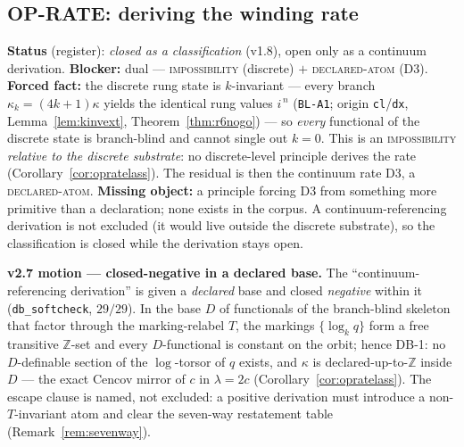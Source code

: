 \documentclass[11pt]{article}
\newcommand{\hx}[1]{\textcolor{cC}{\footnotesize\texttt{#1}}}
\newcommand{\Z}{\mathbb{Z}}
\theoremstyle{plain}
\theoremstyle{definition}
\theoremstyle{remark}
\begin{document}
\subsection{OP-RATE: deriving the winding rate}\label{blk:rate}
\textbf{Status} (register): \emph{closed as a classification} (v1.8), open only as a
continuum derivation. \textbf{Blocker:} dual --- \textsc{impossibility}
(discrete) $+$ \textsc{declared-atom} (D3). \textbf{Forced fact:} the discrete
rung state is $k$-invariant --- every branch $\kappa_k=(4k+1)\kappa$ yields the
identical rung values $i^{\,n}$ (\hx{BL-A1}; origin \texttt{cl}/\texttt{dx},
Lemma~\ref{lem:kinvext}, Theorem~\ref{thm:r6nogo}) --- so \emph{every} functional
of the discrete state is branch-blind and cannot single out $k=0$. This is an
\textsc{impossibility} \emph{relative to the discrete substrate}: no
discrete-level principle derives the rate (Corollary~\ref{cor:opratelass}). The
residual is then the continuum rate D3, a \textsc{declared-atom}.
\textbf{Missing object:} a principle forcing D3 from something more primitive
than a declaration; none exists in the corpus. A continuum-referencing
derivation is not excluded (it would live outside the discrete substrate), so
the classification is closed while the derivation stays open.

\smallskip\noindent
\textbf{v2.7 motion --- closed-negative in a declared base.} The
``continuum-referencing derivation'' is given a \emph{declared} base and closed
\emph{negative} within it (\texttt{db\_softcheck}, $29/29$). In the base $D$ of
functionals of the branch-blind skeleton that factor through the marking-relabel
$T$, the markings $\{\log_k q\}$ form a free transitive $\Z$-set and every
$D$-functional is constant on the orbit; hence \textsc{DB-1}: no $D$-definable
section of the $\log$-torsor of $q$ exists, and $\kappa$ is declared-up-to-$\Z$
inside $D$ --- the exact Cencov mirror of $c$ in $\lambda=2c$
(Corollary~\ref{cor:opratelass}). The escape clause is named, not excluded: a
positive derivation must introduce a non-$T$-invariant atom and clear the seven-way
restatement table (Remark~\ref{rem:sevenway}).
\end{document}
